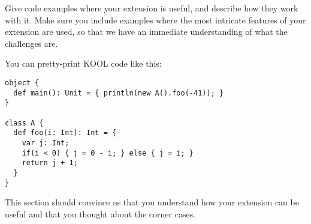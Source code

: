 Give code examples where your extension is useful, and describe how they work
with it. Make sure you include examples where the most intricate features of
your extension are used, so that we have an immediate understanding of what the
challenges are.

You can pretty-print KOOL code like this:
\begin{lstlisting}
object {
  def main(): Unit = { println(new A().foo(-41)); }
}

class A {
  def foo(i: Int): Int = {
    var j: Int;
    if(i < 0) { j = 0 - i; } else { j = i; }
    return j + 1;
  }
}
\end{lstlisting}

This section should convince us that you understand how your extension can be
useful and that you thought about the corner cases.
